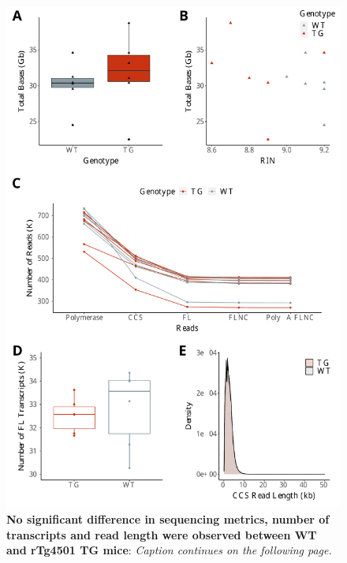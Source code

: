 \begin{figure}[htp]
	\begin{center}
		\includegraphics[page=1,trim={0 0 0 0},clip,scale = 0.55]{Figures/rTg4510WholeTranscriptome.pdf}
	\end{center}
	\captionsetup{width=0.95\textwidth}
	\caption[Iso-Seq sequencing metrics from global transcriptome profiling of rTg4510 mice]%
	{\textbf{No significant difference in sequencing metrics, number of transcripts and read length were observed between WT and rTg4501 TG mice}: \textit{Caption continues on the following page.}}
	\label{fig:rTg4510_sequencing_metrics}
\end{figure}
